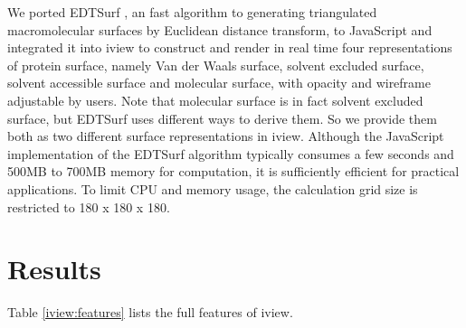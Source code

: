 We ported EDTSurf \citep{1297,1350}, an fast algorithm to generating triangulated macromolecular surfaces by Euclidean distance transform, to JavaScript and integrated it into iview to construct and render in real time four representations of protein surface, namely Van der Waals surface, solvent excluded surface, solvent accessible surface and molecular surface, with opacity and wireframe adjustable by users. Note that molecular surface is in fact solvent excluded surface, but EDTSurf uses different ways to derive them. So we provide them both as two different surface representations in iview. Although the JavaScript implementation of the EDTSurf algorithm typically consumes a few seconds and 500MB to 700MB memory for computation, it is sufficiently efficient for practical applications. To limit CPU and memory usage, the calculation grid size is restricted to 180 x 180 x 180.

\section{Results}

Table \ref{iview:features} lists the full features of iview.

